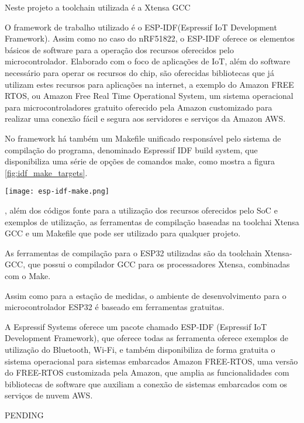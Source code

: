 Neste projeto a toolchain utilizada é a Xtensa GCC

O framework de trabalho utilizado é o ESP-IDF(Espressif IoT Development
Framework). Assim como no caso do nRF51822, o ESP-IDF oferece os elementos
básicos de software para a operação dos recursos oferecidos pelo
microcontrolador. Elaborado com o foco de aplicações de IoT, além do software
necessário para operar os recursos do chip, são oferecidas bibliotecas que já
utilizam estes recursos para aplicações na internet, a exemplo do Amazon FREE
RTOS, ou Amazon Free Real Time Operational System, um sistema operacional para
microcontroladores gratuito oferecido pela Amazon customizado para realizar uma
conexão fácil e segura aos servidores e serviços da Amazon AWS.

No framework há também um Makefile unificado responsável pelo sistema de
compilação do programa, denominado Espressif IDF build system, que disponibiliza
uma série de opções de comandos make, como mostra a figura
\ref{fig:idf_make_targets}.

\begin{center}
	\centering 
	\texttt{[image: esp-idf-make.png]}
	\label{fig:idf_make_targets}
\end{center}





, além dos códigos fonte para a utilização dos
recursos oferecidos pelo SoC e exemplos de utilização, as ferramentas de
compilação baseadas na toolchai Xtensa GCC e um Makefile que pode ser utilizado
para qualquer projeto.

As ferramentas de compilação para o ESP32 utilizadas são da toolchain
Xtensa-GCC, que possui o compilador GCC para os processadores Xtensa,
combinadas com o Make.




Assim como para a estação de medidas, o ambiente de desenvolvimento para o
microcontrolador ESP32 é baseado em ferramentas gratuitas. 





A Espressif Systems oferece um pacote chamado ESP-IDF (Espressif IoT
Development Framework), que oferece todas as ferramenta oferece exemplos de utilização do Bluetooth, Wi-Fi, e
também disponibiliza de forma gratuita o sistema operacional para sistemas embarcados Amazon FREE-RTOS,
uma versão do FREE-RTOS customizada pela Amazon, que amplia as funcionalidades
com bibliotecas de software que auxiliam a conexão de sistemas embarcados com
os serviços de nuvem AWS.

PENDING

